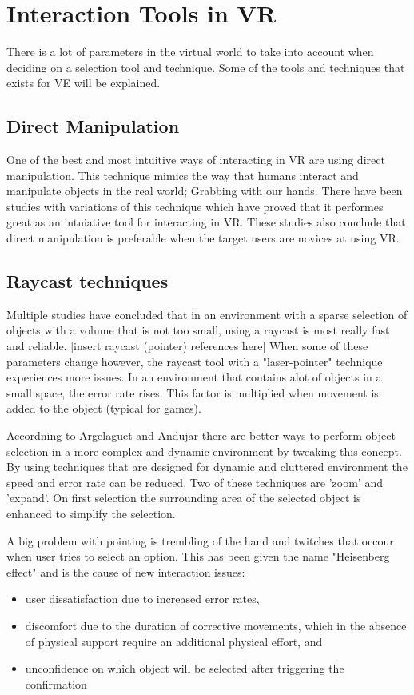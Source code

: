 \section{Interaction Tools in VR}
\label{theory:toolsandtech}
There is a lot of parameters in the virtual world to take into account when deciding on a selection tool and technique. Some of the tools and techniques that exists for VE will be explained.
\subsection{Direct Manipulation}
One of the best and most intuitive ways of interacting in VR are using direct  manipulation.\cite{tools:jacoby1994gestural} This technique mimics the way that humans interact and manipulate objects in the real world; Grabbing with our hands. There have been studies with variations of this technique which have proved that it performes great as an intuiative tool for interacting in VR.\cite{tools:Buchmann2004,tools:Cutler1997} These studies also conclude that direct manipulation is preferable when the target users are novices at using VR. 
\subsection{Raycast techniques}
Multiple studies have concluded that in an environment with a sparse selection of objects with a volume that is not too small, using a raycast is most really fast and reliable. [insert raycast (pointer) references here] When some of these parameters change however, the raycast tool with a "laser-pointer" technique experiences more issues. In an environment that contains alot of objects in a small space, the error rate rises. This factor is multiplied when movement is added to the object (typical for games).

Accordning to Argelaguet and Andujar there are better ways to perform object selection in a more complex and dynamic environment by tweaking this concept.\cite{selection:Argelaguet2008} By using techniques that are designed for dynamic and cluttered environment the speed and error rate can be reduced. Two of these techniques are 'zoom' and 'expand'. On first selection the surrounding area of the selected object is enhanced to simplify the selection.

A big problem with pointing is trembling of the hand and twitches that occour when user tries to select an option. This has been given the name "Heisenberg effect" and is the cause of new interaction issues\cite{selection:Bowman2001}:

\begin{itemize}
\item user dissatisfaction due to increased error rates,
\item discomfort due to the duration of corrective movements, which in the absence of physical support require an additional physical effort, and
\item unconfidence on which object will be selected after triggering the confirmation
\end{itemize}
